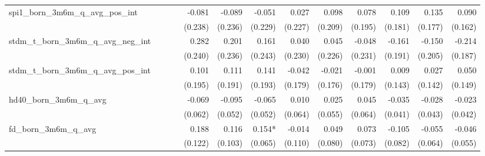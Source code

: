 \begin{tabular}{lrrrrrrrrrrrr}
spi1\_born\_3m6m\_q\_avg\_pos\_int          &              &              &              &       -0.081 &       -0.089 &       -0.051 &        0.027 &        0.098 &        0.078 &        0.109 &        0.135 &        0.090 \\ 
                                            &              &              &              &      (0.238) &      (0.236) &      (0.229) &      (0.227) &      (0.209) &      (0.195) &      (0.181) &      (0.177) &      (0.162) \\ 
stdm\_t\_born\_3m6m\_q\_avg\_neg\_int       &              &              &              &        0.282 &        0.201 &        0.161 &        0.040 &        0.045 &       -0.048 &       -0.161 &       -0.150 &       -0.214 \\ 
                                            &              &              &              &      (0.240) &      (0.236) &      (0.243) &      (0.230) &      (0.226) &      (0.231) &      (0.191) &      (0.205) &      (0.187) \\ 
stdm\_t\_born\_3m6m\_q\_avg\_pos\_int       &              &              &              &        0.101 &        0.111 &        0.141 &       -0.042 &       -0.021 &       -0.001 &        0.009 &        0.027 &        0.050 \\ 
                                            &              &              &              &      (0.195) &      (0.191) &      (0.193) &      (0.179) &      (0.176) &      (0.179) &      (0.143) &      (0.142) &      (0.149) \\ 
hd40\_born\_3m6m\_q\_avg                    &              &              &              &       -0.069 &       -0.095 &       -0.065 &        0.010 &        0.025 &        0.045 &       -0.035 &       -0.028 &       -0.023 \\ 
                                            &              &              &              &      (0.062) &      (0.052) &      (0.052) &      (0.064) &      (0.055) &      (0.064) &      (0.041) &      (0.043) &      (0.042) \\ 
fd\_born\_3m6m\_q\_avg                      &              &              &              &        0.188 &        0.116 &       0.154* &       -0.014 &        0.049 &        0.073 &       -0.105 &       -0.055 &       -0.046 \\ 
                                            &              &              &              &      (0.122) &      (0.103) &      (0.065) &      (0.110) &      (0.080) &      (0.073) &      (0.082) &      (0.064) &      (0.055) \\ 

\end{tabular}
